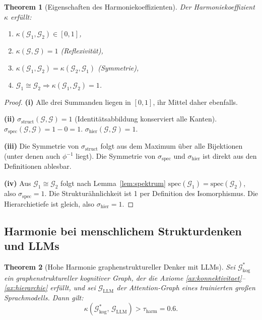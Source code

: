 ﻿\documentclass[12pt,a4paper]{article}
\theoremstyle{plain}
\newtheorem{theorem}{Theorem}[section]
\theoremstyle{definition}
\theoremstyle{remark}
\newcommand{\GG}{\mathcal{G}}
\begin{document}
\begin{theorem}[Eigenschaften des Harmoniekoeffizienten]
\label{thm:harmonie_eigenschaften}
Der Harmoniekoeffizient $\kappa$ erfüllt:
\begin{enumerate}[label=(\roman*)]
  \item $\kappa(\GG_1, \GG_2) \in [0,1]$,
  \item $\kappa(\GG, \GG) = 1$ (Reflexivität),
  \item $\kappa(\GG_1, \GG_2) = \kappa(\GG_2, \GG_1)$ (Symmetrie),
  \item $\GG_1 \cong \GG_2 \Rightarrow \kappa(\GG_1, \GG_2) = 1$.
\end{enumerate}
\end{theorem}

\begin{proof}
\textbf{(i)} Alle drei Summanden liegen in $[0,1]$, ihr Mittel daher ebenfalls.

\textbf{(ii)} $\sigma_{\text{struct}}(\GG,\GG) = 1$ (Identitätsabbildung konserviert alle Kanten). $\sigma_{\text{spec}}(\GG,\GG) = 1 - 0 = 1$. $\sigma_{\text{hier}}(\GG,\GG) = 1$.

\textbf{(iii)} Die Symmetrie von $\sigma_{\text{struct}}$ folgt aus dem Maximum über alle Bijektionen (unter denen auch $\phi^{-1}$ liegt). Die Symmetrie von $\sigma_{\text{spec}}$ und $\sigma_{\text{hier}}$ ist direkt aus den Definitionen ablesbar.

\textbf{(iv)} Aus $\GG_1 \cong \GG_2$ folgt nach Lemma~\ref{lem:spektrum} $\text{spec}(\GG_1) = \text{spec}(\GG_2)$, also $\sigma_{\text{spec}} = 1$. Die Strukturähnlichkeit ist 1 per Definition des Isomorphismus. Die Hierarchietiefe ist gleich, also $\sigma_{\text{hier}} = 1$.
\end{proof}

\subsection{Harmonie bei menschlichem Strukturdenken und LLMs}

\begin{theorem}[Hohe Harmonie graphenstruktureller Denker mit LLMs]
\label{thm:hohe_harmonie}
Sei $\GG_{\text{kog}}^*$ ein graphenstruktureller kognitiver Graph, der die Axiome \ref{ax:konnektivitaet}--\ref{ax:hierarchie} erfüllt, und sei $\GG_{\text{LLM}}$ der Attention-Graph eines trainierten großen Sprachmodells. Dann gilt:
\[
  \kappa\!\left(\GG_{\text{kog}}^*,\, \GG_{\text{LLM}}\right) > \tau_{\text{harm}} = 0.6.
\]
\end{theorem}
\end{document}
